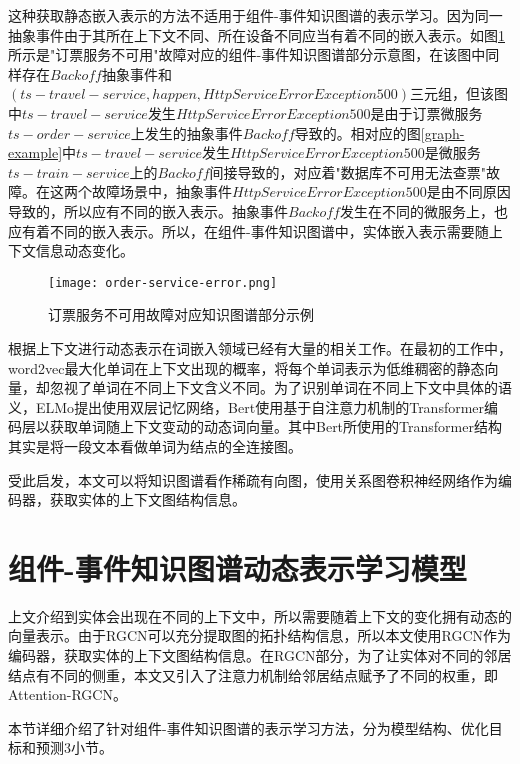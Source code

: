 这种获取静态嵌入表示的方法不适用于组件-事件知识图谱的表示学习。因为同一抽象事件由于其所在上下文不同、所在设备不同应当有着不同的嵌入表示。如图\ref{order-service-error}所示是"订票服务不可用"故障对应的组件-事件知识图谱部分示意图，在该图中同样存在$Backoff$抽象事件和$\left(ts-travel-service, happen, HttpServiceError Exception 500\right)$三元组，但该图中$ts-travel-service$发生$HttpServiceError Exception 500$是由于订票微服务$ts-order-service$上发生的抽象事件$Backoff$导致的。相对应的图\ref{graph-example}中$ts-travel-service$发生$HttpServiceError Exception 500$是微服务$ts-train-service$上的$Backoff$间接导致的，对应着"数据库不可用无法查票"故障。在这两个故障场景中，抽象事件$HttpServiceError Exception 500$是由不同原因导致的，所以应有不同的嵌入表示。抽象事件$Backoff$发生在不同的微服务上，也应有着不同的嵌入表示。所以，在组件-事件知识图谱中，实体嵌入表示需要随上下文信息动态变化。
\begin{figure}[htbp]
    \centering
    \texttt{[image: order-service-error.png]}
    \caption{订票服务不可用故障对应知识图谱部分示例\label{order-service-error}}
\end{figure}

根据上下文进行动态表示在词嵌入领域已经有大量的相关工作。在最初的工作中，word2vec\cite{mikolov2013efficient}最大化单词在上下文出现的概率，将每个单词表示为低维稠密的静态向量，却忽视了单词在不同上下文含义不同。为了识别单词在不同上下文中具体的语义，ELMo\cite{peters2018deep}提出使用双层记忆网络，Bert\cite{devlin2018bert}使用基于自注意力机制的Transformer\cite{vaswani2017attention}编码层以获取单词随上下文变动的动态词向量。其中Bert所使用的Transformer结构其实是将一段文本看做单词为结点的全连接图。

受此启发，本文可以将知识图谱看作稀疏有向图，使用关系图卷积神经网络作为编码器，获取实体的上下文图结构信息。

\section{组件-事件知识图谱动态表示学习模型}
上文介绍到实体会出现在不同的上下文中，所以需要随着上下文的变化拥有动态的向量表示。由于RGCN可以充分提取图的拓扑结构信息，所以本文使用RGCN作为编码器，获取实体的上下文图结构信息。在RGCN部分，为了让实体对不同的邻居结点有不同的侧重，本文又引入了注意力机制给邻居结点赋予了不同的权重，即Attention-RGCN。

本节详细介绍了针对组件-事件知识图谱的表示学习方法，分为模型结构、优化目标和预测3小节。

